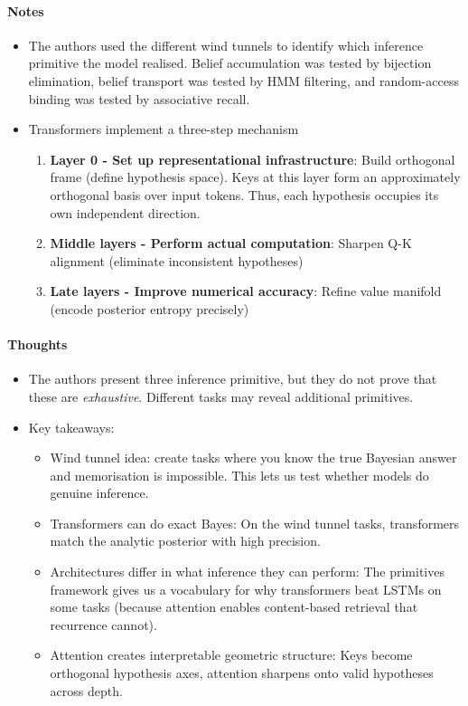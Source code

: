 \documentclass[12pt,a4paper,twoside]{article}
\begin{document}
\begin{paper}
	\paragraph{Notes}
	\begin{itemize}
		\item The authors used the different wind tunnels to identify which inference primitive the model realised. Belief accumulation was tested by bijection elimination, belief transport was tested by HMM filtering, and random-access binding was tested by associative recall.
		\item Transformers implement a three-step mechanism
		      \begin{enumerate}
			      \item \textbf{Layer 0 - Set up representational infrastructure}: Build orthogonal frame (define hypothesis space). Keys at this layer form an approximately orthogonal basis over input tokens. Thus, each hypothesis occupies its own independent direction.
			      \item \textbf{Middle layers - Perform actual computation}: Sharpen Q-K alignment (eliminate inconsistent hypotheses)
			      \item \textbf{Late layers - Improve numerical accuracy}: Refine value manifold (encode posterior entropy precisely)
		      \end{enumerate}
	\end{itemize}

	\paragraph{Thoughts}
	\begin{itemize}
		\item The authors present three inference primitive, but they do not prove that these are \textit{exhaustive}. Different tasks may reveal additional primitives.
		\item Key takeaways:
		      \begin{itemize}
			      \item Wind tunnel idea: create tasks where you know the true Bayesian answer and memorisation is impossible. This lets us test whether models do genuine inference.
			      \item Transformers can do exact Bayes: On the wind tunnel tasks, transformers match the analytic posterior with high precision.
			      \item Architectures differ in what inference they can perform: The primitives framework gives us a vocabulary for why transformers beat LSTMs on some tasks (because attention enables content-based retrieval that recurrence cannot).
			      \item Attention creates interpretable geometric structure: Keys become orthogonal hypothesis axes, attention sharpens onto valid hypotheses across depth.
		      \end{itemize}
	\end{itemize}
\end{paper}
\end{document}
